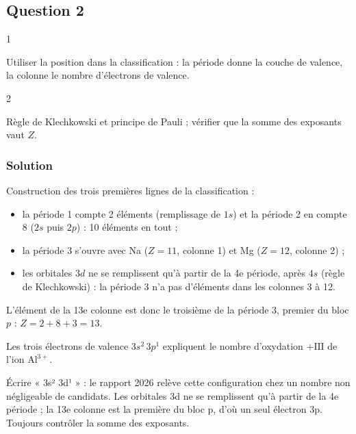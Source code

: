 \documentclass[11pt,a4paper]{article}
\providecommand{\tightlist}{\setlength{\itemsep}{0pt}\setlength{\parskip}{0pt}}
\newcommand{\equationajustee}[1]{%
  \sbox{\boiteequation}{$\displaystyle #1$}%
  \ifdim\wd\boiteequation>\linewidth
    \[\resizebox{\linewidth}{!}{\usebox{\boiteequation}}\]%
  \else
    \[#1\]%
  \fi}
\begin{document}
\hypertarget{question-2}{%
\subsection{Question 2}\label{question-2}}

\begin{indication}{1}

Utiliser la position dans la classification : la période donne la couche de valence, la colonne le nombre d'électrons de valence.

\end{indication}

\begin{indication}{2}

Règle de Klechkowski et principe de Pauli ; vérifier que la somme des exposants vaut \(Z\).

\end{indication}

\hypertarget{solution-1}{%
\subsubsection{Solution}\label{solution-1}}

Construction des trois premières lignes de la classification :

\begin{itemize}
\tightlist
\item
  la période 1 compte 2 éléments (remplissage de \(1s\)) et la période 2 en compte 8 (\(2s\) puis \(2p\)) : 10 éléments en tout ;
\item
  la période 3 s'ouvre avec Na (\(Z=11\), colonne 1) et Mg (\(Z=12\), colonne 2) ;
\item
  les orbitales \(3d\) ne se remplissent qu'à partir de la 4e période, après \(4s\) (règle de Klechkowski) : la période 3 n'a pas d'éléments dans les colonnes 3 à 12.
\end{itemize}

L'élément de la 13e colonne est donc le troisième de la période 3, premier du bloc \(p\) : \(Z=2+8+3=13\).

\equationajustee{\boxed{\mathrm{Al} : 1s^2\,2s^2\,2p^6\,3s^2\,3p^1}}

Les trois électrons de valence \(3s^2\,3p^1\) expliquent le nombre d'oxydation \(+\mathrm{III}\) de l'ion \(\mathrm{Al^{3+}}\).

\begin{piege}

Écrire « 3s² 3d¹ » : le rapport 2026 relève cette configuration chez un nombre non négligeable de candidats. Les orbitales 3d ne se remplissent qu'à partir de la 4e période ; la 13e colonne est la première du bloc p, d'où un seul électron 3p. Toujours contrôler la somme des exposants.

\end{piege}
\end{document}
